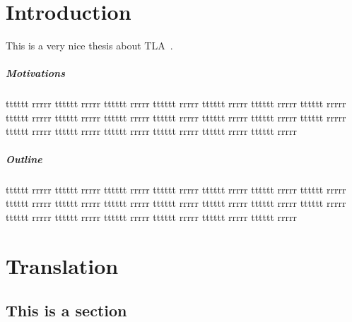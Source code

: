 \documentclass{thesul}
\begin{document}
\WritePartLabelInToc
\WriteChapterLabelInToc


\tableofcontents

\NoChapterHead


\mainmatter


\chapter{Introduction}
This is a very nice thesis about TLA~\cite{tlabook}.

\paragraph*{Motivations}

tttttt rrrrr tttttt rrrrr tttttt rrrrr tttttt rrrrr tttttt rrrrr
tttttt rrrrr tttttt rrrrr tttttt rrrrr tttttt rrrrr tttttt rrrrr
tttttt rrrrr tttttt rrrrr tttttt rrrrr tttttt rrrrr tttttt rrrrr
tttttt rrrrr tttttt rrrrr tttttt rrrrr tttttt rrrrr tttttt rrrrr

\paragraph*{Outline}

tttttt rrrrr tttttt rrrrr tttttt rrrrr tttttt rrrrr tttttt rrrrr
tttttt rrrrr tttttt rrrrr tttttt rrrrr tttttt rrrrr tttttt rrrrr
tttttt rrrrr tttttt rrrrr tttttt rrrrr tttttt rrrrr tttttt rrrrr
tttttt rrrrr tttttt rrrrr tttttt rrrrr tttttt rrrrr tttttt rrrrr

\chapter{Translation}

\section{This is a section}
\end{document}
